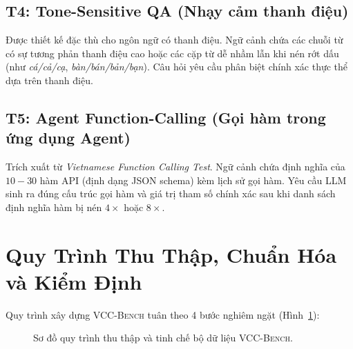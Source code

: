 \documentclass[12pt,a4paper]{article}
\newcommand{\method}[1]{\textsc{#1}}
\newcommand{\viet}[1]{\textit{#1}}
\begin{document}
\subsection{T4: Tone-Sensitive QA (Nhạy cảm thanh điệu)}
Được thiết kế đặc thù cho ngôn ngữ có thanh điệu. Ngữ cảnh chứa các chuỗi từ có sự tương phản thanh điệu cao hoặc các cặp từ dễ nhầm lẫn khi nén rớt dấu (như \viet{cá/cả/cạ}, \viet{bàn/bán/bản/bạn}). Câu hỏi yêu cầu phân biệt chính xác thực thể dựa trên thanh điệu.

\subsection{T5: Agent Function-Calling (Gọi hàm trong ứng dụng Agent)}
Trích xuất từ \viet{Vietnamese Function Calling Test}. Ngữ cảnh chứa định nghĩa của $10 - 30$ hàm API (định dạng JSON schema) kèm lịch sử gọi hàm. Yêu cầu LLM sinh ra đúng cấu trúc gọi hàm và giá trị tham số chính xác sau khi danh sách định nghĩa hàm bị nén $4\times$ hoặc $8\times$.

\section{Quy Trình Thu Thập, Chuẩn Hóa và Kiểm Định}

Quy trình xây dựng \method{VCC-Bench} tuân theo 4 bước nghiêm ngặt (Hình~\ref{fig:pipeline}):

\begin{figure}[H]
\centering
{}
\caption{Sơ đồ quy trình thu thập và tinh chế bộ dữ liệu \method{VCC-Bench}.}
\label{fig:pipeline}
\end{figure}
\end{document}
